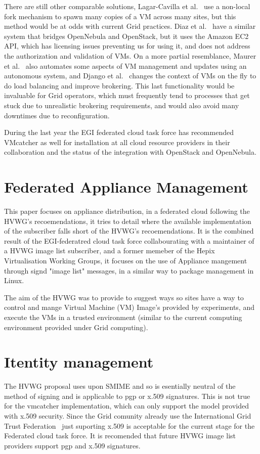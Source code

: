 \documentclass{llncs_Ibergrid2013}
\begin{document}
There are still other comparable solutions, Lagar-Cavilla et al.~\cite{Lagar-Cavilla2009} use a non-local fork mechanism to spawn many copies of a VM across many sites, but this method would be at odds with current Grid practices. Diaz et al.~\cite{Diaz2012} have a similar system that bridges OpenNebula and OpenStack, but it uses the Amazon EC2 API, which has licensing issues preventing us for using it, and does not address the authorization and validation of VMs. On a more partial resemblance, Maurer et al.~\cite{Maurer2013} also automates some aspects of VM management and updates using an autonomous system, and Django et al.~\cite{Django2013} changes the context of VMs on the fly to do load balancing and improve brokering. This last functionality would be invaluable for Grid operators, which must frequently tend to processes that get stuck due to unrealistic brokering requirements, and would also avoid many downtimes due to reconfiguration.


During the last year the EGI federated cloud task force has recommended VMcatcher as well for installation at all cloud resource providers in their collaboration and the status of the integration with OpenStack and OpenNebula.

\section{Federated Appliance Management}
\label{sect-fedimagemanagement}

This paper focuses on appliance distribution, in a federated cloud following the HVWG's recoemendations, it tries to detail where the available implementation of the subscriber falls short of the HVWG's recoemendations. It is the combined result of the EGI-federatred cloud task force collabourating with a maintainer of a HVWG image list subscriber, and a former memeber of the Hepix Virtualisation Working Groups, it focuses on the use of Appliance mangement through signd "image list" messages, in a similar way to package management in Linux.

The aim of the HVWG was to provide to suggest ways so sites have a way to control and mange Virtual Machine (VM) Image's provided by experiments, and execute the VMs in a trusted environment (similar to the current computing environment provided under Grid computing).
\section{Itentity management}
\label{sect-fedimagemanagement}
The HVWG proposal uses upon SMIME and so is esentially neutral of the method of signing and is applicable to pgp or x.509 signatures. This is not true for the vmcatcher implementation, which can only support the model provided with x.509 security. Since the Grid comunity already use the International Grid Trust Federation~\cite{igtf} just suporting x.509 is acceptable for the current stage for the Federated cloud task force. It is recomended that future HVWG image list providers support pgp and x.509 signatures.
\end{document}
